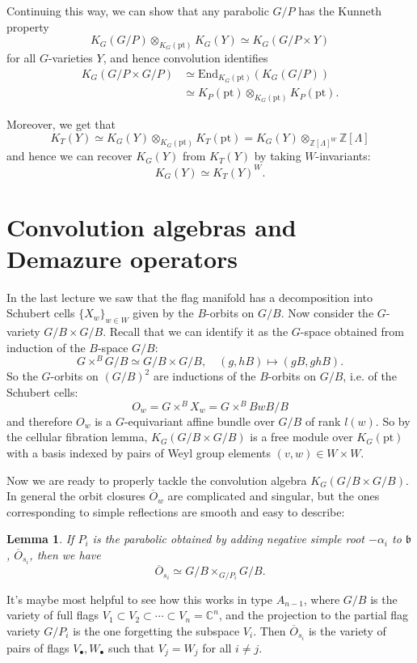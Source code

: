 \documentclass[11pt]{amsart}
\newtheorem{lemma}[dummy]{Lemma}
\theoremstyle{definition}
\newcommand{\bC}{\mathbb{C}}
\newcommand{\bZ}{\mathbb{Z}}
\numberwithin{equation}{subsection}
\numberwithin{figure}{subsection}
\newcommand{\pt}{\mathrm{pt}}
\begin{document}
Continuing this way, we can show that any parabolic $G/P$ has the Kunneth property
$$
K_G(G/P)\otimes_{K_G(\pt)}K_G(Y)\simeq K_G(G/P\times Y)
$$
for all $G$-varieties $Y$, and hence convolution identifies
\begin{align*}
K_G(G/P\times G/P)&\simeq \mathrm{End}_{K_G(\pt)}(K_G(G/P))\\
&\simeq K_P(\pt)\otimes_{K_G(\pt)}K_P(\pt).
\end{align*}

Moreover, we get that
$$
K_T(Y)\simeq K_G(Y)\otimes_{K_G(\pt)}K_T(\pt)=K_G(Y)\otimes_{\bZ[\Lambda]^W}\bZ[\Lambda]
$$
and hence we can recover $K_G(Y)$ from $K_T(Y)$ by taking $W$-invariants:
$$
K_G(Y)\simeq K_T(Y)^W.
$$
\section{Convolution algebras and Demazure operators}
In the last lecture we saw that the flag manifold has a decomposition into Schubert cells $\{X_w\}_{w\in W}$ given by the $B$-orbits on $G/B$.  Now consider the $G$-variety $G/B\times G/B$. Recall that we can identify it as the $G$-space obtained from induction of the $B$-space $G/B$:
$$
G\times^BG/B \simeq G/B\times G/B, \quad (g,hB)\mapsto (gB,ghB).
$$
So the $G$-orbits on $(G/B)^2$ are inductions of the $B$-orbits on $G/B$, i.e. of the Schubert cells:
$$
O_w = G\times^B X_w = G\times^B BwB/B
$$
and therefore $O_w$ is a $G$-equivariant affine bundle over $G/B$ of rank $l(w)$. So by the cellular fibration lemma, $K_G(G/B\times G/B)$ is a free module over $K_G(\pt)$ with a basis indexed by pairs of Weyl group elements $(v,w)\in W\times W$.

Now we are ready to properly tackle the convolution algebra $K_G(G/B\times G/B)$. In general the orbit closures $\overline{O}_w$ are complicated and singular, but the ones corresponding to simple reflections are smooth and easy to describe:
\begin{lemma}
If $P_i$ is the parabolic obtained by adding negative simple root $-\alpha_i$ to $\mathfrak{b}$, $\overline{O}_{s_i}$, then we have
$$
\overline{O}_{s_i}\simeq G/B\times_{G/P_i} G/B.
$$
\end{lemma}
It's maybe most helpful to see how this works in type $A_{n-1}$, where $G/B$ is the variety of full flags $V_1\subset V_2\subset\cdots\subset V_n=\bC^n$, and the projection to the partial flag variety $G/P_i$ is the one forgetting the subspace $V_i$. Then $\overline{O}_{s_i}$ is the variety of pairs of flags $V_\bullet,W_\bullet$ such that $V_j=W_j$ for all $i\neq j$. 
\end{document}
